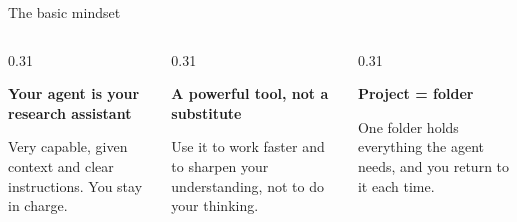\documentclass[aspectratio=169,11pt]{beamer}
\newcommand{\icon}[1]{\textcolor{accent}{#1}}
\begin{document}
\begin{frame}{The basic mindset}
  \begin{columns}[T]
    \begin{column}{0.31\textwidth}
      \centering
      \parbox[c][1.3cm][c]{\linewidth}{\centering\Huge\icon{\faUserTie}}\par
      \textbf{Your agent is your research assistant}\par\medskip
      {\small Very capable, given context and clear instructions. You stay in charge.}\par\medskip
      
    \end{column}
    \begin{column}{0.31\textwidth}
      \centering
      \parbox[c][1.3cm][c]{\linewidth}{\centering\Huge\icon{\faTools}}\par
      \textbf{A powerful tool, not a substitute}\par\medskip
      {\small Use it to work faster and to sharpen your understanding, not to do your thinking.}\par\medskip
      
    \end{column}
    \begin{column}{0.31\textwidth}
      \centering
      \parbox[c][1.3cm][c]{\linewidth}{\centering\Huge\icon{\faFolderOpen}}\par
      \textbf{Project = folder}\par\medskip
      {\small One folder holds everything the agent needs, and you return to it each time.}\par\medskip

    \end{column}
  \end{columns}
  \vspace{1.2em}
\end{frame}
\end{document}
